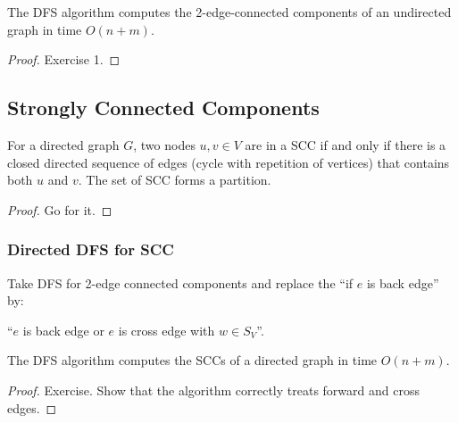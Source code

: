 \begin{mytheorem}
The DFS algorithm computes the 2-edge-connected components of an undirected graph in time $O(n+m)$.
\end{mytheorem}
\begin{proof}
Exercise 1.
\end{proof}

\subsection{Strongly Connected Components}

\begin{mylemma}
For a directed graph $G$, two nodes $u,v \in V$ are in a SCC if and only if there is a closed directed sequence of edges (cycle with repetition of vertices) that contains both $u$ and $v$. The set of SCC forms a partition.
\end{mylemma}
\begin{proof}
Go for it.
\end{proof}

\subsubsection{Directed DFS for SCC}

Take DFS for 2-edge connected components and replace the ``if $e$ is back edge'' by:

``$e$ is back edge or $e$ is cross edge with $w \in S_V$''.

\begin{mytheorem}
The DFS algorithm computes the SCCs of a directed graph in time $O(n+m)$.
\end{mytheorem}
\begin{proof}
Exercise. Show that the algorithm correctly treats forward and cross edges.
\end{proof}

